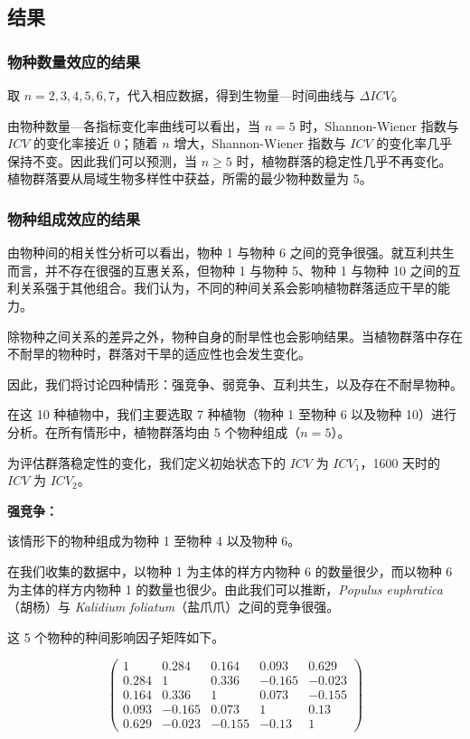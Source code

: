 \documentclass[11pt,a4paper]{ctexart}
\begin{document}
\subsection{结果}

\subsubsection{物种数量效应的结果}

取 $n=2,3,4,5,6,7$，代入相应数据，得到生物量—时间曲线与 $\Delta ICV$。

由物种数量—各指标变化率曲线可以看出，当 $n=5$ 时，Shannon-Wiener 指数与 $ICV$ 的变化率接近 0；随着 $n$ 增大，Shannon-Wiener 指数与 $ICV$ 的变化率几乎保持不变。因此我们可以预测，当 $n\geqslant 5$ 时，植物群落的稳定性几乎不再变化。植物群落要从局域生物多样性中获益，所需的最少物种数量为 5。

\subsubsection{物种组成效应的结果}

由物种间的相关性分析可以看出，物种 1 与物种 6 之间的竞争很强。就互利共生而言，并不存在很强的互惠关系，但物种 1 与物种 5、物种 1 与物种 10 之间的互利关系强于其他组合。我们认为，不同的种间关系会影响植物群落适应干旱的能力。

除物种之间关系的差异之外，物种自身的耐旱性也会影响结果。当植物群落中存在不耐旱的物种时，群落对干旱的适应性也会发生变化。

因此，我们将讨论四种情形：强竞争、弱竞争、互利共生，以及存在不耐旱物种。

在这 10 种植物中，我们主要选取 7 种植物（物种 1 至物种 6 以及物种 10）进行分析。在所有情形中，植物群落均由 5 个物种组成（$n=5$）。

为评估群落稳定性的变化，我们定义初始状态下的 $ICV$ 为 $ICV_1$，1600 天时的 $ICV$ 为 $ICV_2$。

\textbf{强竞争：}

该情形下的物种组成为物种 1 至物种 4 以及物种 6。

在我们收集的数据中，以物种 1 为主体的样方内物种 6 的数量很少，而以物种 6 为主体的样方内物种 1 的数量也很少。由此我们可以推断，\textit{Populus euphratica}（胡杨）与 \textit{Kalidium foliatum}（盐爪爪）之间的竞争很强。

这 5 个物种的种间影响因子矩阵如下。

\[
\begin{pmatrix}
1 & 0.284 & 0.164 & 0.093 & 0.629\\
0.284 & 1 & 0.336 & -0.165 & -0.023\\
0.164 & 0.336 & 1 & 0.073 & -0.155\\
0.093 & -0.165 & 0.073 & 1 & 0.13\\
0.629 & -0.023 & -0.155 & -0.13 & 1
\end{pmatrix}
\]
\end{document}
